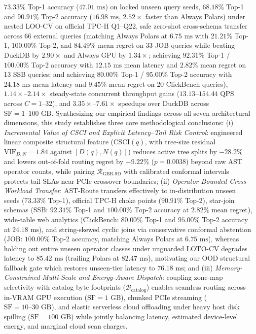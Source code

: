 \documentclass[10pt,a4paper]{article}
\begin{document}
$73.33\%$ Top-1 accuracy ($47.01\text{ ms}$) on locked unseen query seeds, $68.18\%$ Top-1 and $90.91\%$ Top-2 accuracy ($16.98\text{ ms}$, $2.52\times$ faster than Always Polars) under nested LOO-CV on official TPC-H Q1--Q22, safe zero-shot cross-schema transfer across 66 external queries (matching Always Polars at $6.75\text{ ms}$ with $21.21\%$ Top-1, $100.00\%$ Top-2, and $84.49\%$ mean regret on 33 JOB queries while beating DuckDB by $2.90\times$ and Always GPU by $1.34\times$; achieving $92.31\%$ Top-1 / $100.00\%$ Top-2 accuracy with $12.15\text{ ms}$ mean latency and $2.82\%$ mean regret on 13 SSB queries; and achieving $80.00\%$ Top-1 / $95.00\%$ Top-2 accuracy with $24.18\text{ ms}$ mean latency and $9.45\%$ mean regret on 20 ClickBench queries), $1.14\times\text{--}2.14\times$ steady-state concurrent throughput gains ($13.13\text{--}154.44\text{ QPS}$ across $C=1\text{--}32$), and $3.35\times\text{--}7.61\times$ speedups over DuckDB across $\text{SF}=1\text{--}100\text{ GB}$. Synthesizing our empirical findings across all seven architectural dimensions, this study establishes three core methodological conclusions: (i) \textit{Incremental Value of CSCI and Explicit Latency--Tail Risk Control}: engineered linear composite structural feature ($\text{CSCI}(q)$, with tree-size residual $\text{VIF}_{D,N}=1.84$ against $[D(q), N(q)]$) reduces active tree splits by $-28.2\%$ and lowers out-of-fold routing regret by $-9.22\%$ ($p=0.0038$) beyond raw AST operator counts, while pairing $\mathcal{R}_{\text{GBR-9D}}$ with calibrated conformal intervals protects tail SLAs near PCIe crossover boundaries; (ii) \textit{Operator-Bounded Cross-Workload Transfer}: AST-Route transfers effectively to in-distribution unseen seeds ($73.33\%$ Top-1), official TPC-H choke points ($90.91\%$ Top-2), star-join schemas (SSB: $92.31\%$ Top-1 and $100.00\%$ Top-2 accuracy at $2.82\%$ mean regret), wide-table web analytics (ClickBench: $80.00\%$ Top-1 and $95.00\%$ Top-2 accuracy at $24.18\text{ ms}$), and string-skewed cyclic joins via conservative conformal abstention (JOB: $100.00\%$ Top-2 accuracy, matching Always Polars at $6.75\text{ ms}$), whereas holding out entire unseen operator classes under unguarded LOTO-CV degrades latency to $85.42\text{ ms}$ (trailing Polars at $82.47\text{ ms}$), motivating our OOD structural fallback gate which restores unseen-tier latency to $76.18\text{ ms}$; and (iii) \textit{Memory-Constrained Multi-Scale and Energy-Aware Dispatch}: coupling zone-map selectivity with catalog byte footprints ($\mathcal{B}_{\text{catalog}}$) enables seamless routing across in-VRAM GPU execution ($\text{SF}=1\text{ GB}$), chunked PCIe streaming ($\text{SF}=10\text{--}30\text{ GB}$), and elastic serverless cloud offloading under heavy host disk spilling ($\text{SF}=100\text{ GB}$) while jointly balancing latency, estimated device-level energy, and marginal cloud scan charges.
\end{document}
